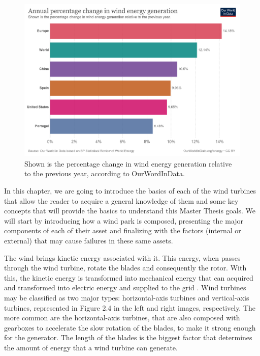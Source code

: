 \begin{figure}[htbp]
	\centering
	\includegraphics[width=\textwidth]{Chapters/Figures/background_fig4.PNG}
	\caption{Shown is the percentage change in wind energy generation relative to the previous year, according to OurWordInData. \cite{OLD_33_GENERAL} }
	\label{fig:Figuras_Tree_silhouettes-vectorial}
\end{figure}


In this chapter, we are going to introduce the basics of each of the wind turbines that allow the reader to acquire a general knowledge of them and some key concepts that will provide the basics to understand this Master Thesis goals. We will start by introducing how a wind park is composed, presenting the major components of each of their asset and finalizing with the factors (internal or external) that may cause failures in these same assets.


The wind brings kinetic energy associated with it. This energy, when passes through the wind turbine, rotate the blades and consequently the rotor. With this, the kinetic energy is transformed into mechanical energy that can acquired and transformed into electric energy and supplied to the grid \cite{OLD_29_WIND} \cite{OLD_31}.
Wind turbines may be classified as two major types: horizontal-axis turbines and vertical-axis turbines, represented in Figure 2.4 in the left and right images, respectively. The more common are the horizontal-axis turbines, that are also composed with gearboxes to accelerate the slow rotation of the blades, to make it strong enough for the generator. The length of the blades is the biggest factor that determines the amount of energy that a wind turbine can generate.

